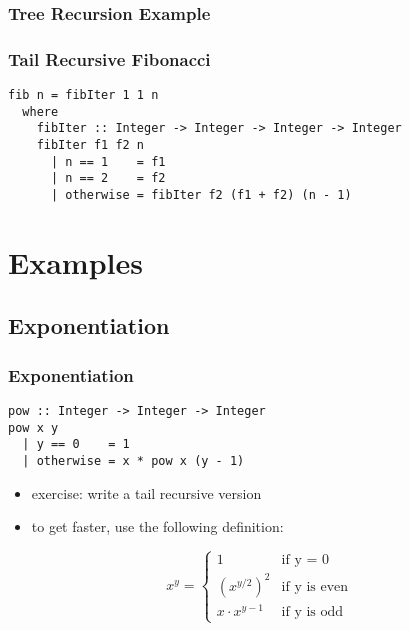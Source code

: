 \documentclass[dvipsnames]{beamer}
\theoremstyle{plain}
\begin{document}
\begin{frame}[fragile]
  \frametitle{Tree Recursion Example}

  \begin{center}
  \end{center}
\end{frame}

\begin{frame}[fragile]
  \frametitle{Tail Recursive Fibonacci}

  \begin{exampleblock}{}
    \begin{lstlisting}
fib n = fibIter 1 1 n
  where
    fibIter :: Integer -> Integer -> Integer -> Integer
    fibIter f1 f2 n
      | n == 1    = f1
      | n == 2    = f2
      | otherwise = fibIter f2 (f1 + f2) (n - 1)
    \end{lstlisting}
  \end{exampleblock}
\end{frame}

\section{Examples}

\subsection{Exponentiation}

\begin{frame}[fragile]
  \frametitle{Exponentiation}

  \begin{lstlisting}
pow :: Integer -> Integer -> Integer
pow x y
  | y == 0    = 1
  | otherwise = x * pow x (y - 1)
  \end{lstlisting}

  \pause
  \begin{itemize}
    \item exercise: write a tail recursive version
  \end{itemize}

  \pause
  \begin{itemize}
    \item to get faster, use the following definition:
  \end{itemize}
  \[
    x^y =
      \begin{cases}
        1               & \mbox{if y = 0}\\
        {(x^{y/2})}^2   & \mbox{if y is even}\\
        x \cdot x^{y-1} & \mbox{if y is odd}
      \end{cases}
  \]
\end{frame}
\end{document}
